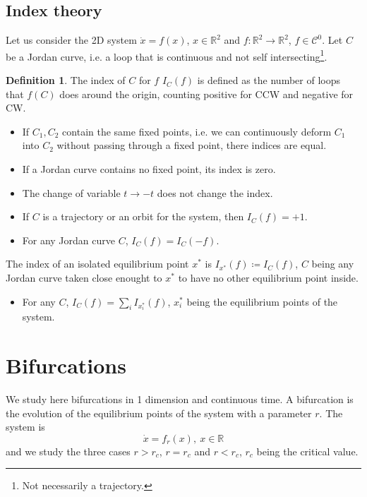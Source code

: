 \documentclass[12pt, openany]{report}
\theoremstyle{definition}
\newtheorem{definition}[thm]{Definition}
\newcommand{\R}{\mathbb{R}}
\begin{document}
\section{Index theory}
Let us consider the 2D system \(\dot x=f(x)\), \(x\in \R^2\) and \(f:\R^2\rightarrow \R^2\), \(f\in \mathcal{C}^0\). Let \(C\) be a Jordan curve, i.e. a loop that is continuous and not self intersecting\footnote{Not necessarily a trajectory.}.
\begin{definition}
    The index of \(C\) for \(f\) \(I_C(f)\) is defined as the number of loops that \(f(C)\) does around the origin, counting positive for CCW and negative for CW.
\end{definition}
\begin{itemize}
    \item If \(C_1,C_2\) contain the same fixed points, i.e. we can continuously deform \(C_1\) into \(C_2\) without passing through a fixed point, there indices are equal.
    \item If a Jordan curve contains no fixed point, its index is zero.
    \item The change of variable \(t\rightarrow -t\) does not change the index.
    \item If \(C\) is a trajectory or an orbit for the system, then \(I_C(f) = +1\).
    \item For any Jordan curve \(C\), \(I_C(f) = I_C(-f)\).
\end{itemize}
The index of an isolated equilibrium point \(x^*\) is \(I_{x^*}(f)\coloneqq I_C(f)\), \(C\) being any Jordan curve taken close enought to \(x^*\) to have no other equilibrium point inside. 
\begin{itemize}
    \item For any $C$, $I_C(f)=\sum_i I_{x_i^*}(f)$, $x_i^*$ being the equilibrium points of the system. 
\end{itemize}
\chapter{Bifurcations}
We study here bifurcations in 1 dimension and continuous time. A bifurcation is the evolution of the equilibrium points of the system with a parameter $r$. The system is 
\begin{equation}
    \dot x= f_r(x),\: x\in \R
\end{equation}
and we study the three cases \(r>r_c\), $r=r_c$ and $r<r_c$, $r_c$ being the critical value. 
\end{document}
